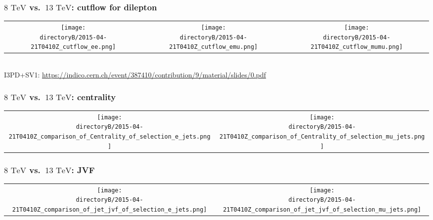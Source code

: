 \begin{frame}
\frametitle{${8\textrm{ TeV}}$ vs.~${13\textrm{ TeV}}$: cutflow for dilepton}
\begin{center}
\begin{tabular}{ccc}
\texttt{[image: \\directoryB/2015-04-21T0410Z\_cutflow\_ee.png]}&\texttt{[image: \\directoryB/2015-04-21T0410Z\_cutflow\_emu.png]}&
\texttt{[image: \\directoryB/2015-04-21T0410Z\_cutflow\_mumu.png]}\\
\end{tabular}
\vspace{0.5 cm}\\I3PD+SV1: \url{https://indico.cern.ch/event/387410/contribution/9/material/slides/0.pdf}
\end{center}
\end{frame}

\begin{frame}
\frametitle{${8\textrm{ TeV}}$ vs.~${13\textrm{ TeV}}$: centrality}
\begin{center}
\begin{tabular}{cc}
\texttt{[image: \\directoryB/2015-04-21T0410Z\_comparison\_of\_Centrality\_of\_selection\_e\_jets.png]}&\texttt{[image: \\directoryB/2015-04-21T0410Z\_comparison\_of\_Centrality\_of\_selection\_mu\_jets.png]}\\
\end{tabular}
\end{center}
\end{frame}

\begin{frame}
\frametitle{${8\textrm{ TeV}}$ vs.~${13\textrm{ TeV}}$: JVF}
\begin{center}
\begin{tabular}{cc}
\texttt{[image: \\directoryB/2015-04-21T0410Z\_comparison\_of\_jet\_jvf\_of\_selection\_e\_jets.png]}&\texttt{[image: \\directoryB/2015-04-21T0410Z\_comparison\_of\_jet\_jvf\_of\_selection\_mu\_jets.png]}\\
\end{tabular}
\end{center}
\end{frame}

